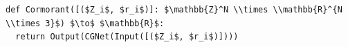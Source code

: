 \documentclass[border=10pt]{standalone}
\begin{document}
\begin{lstlisting}
def Cormorant([($Z_i$, $r_i$)]: $\mathbb{Z}^N \\times \\mathbb{R}^{N \\times 3}$) $\to$ $\mathbb{R}$:
  return Output(CGNet(Input([($Z_i$, $r_i$)])))
\end{lstlisting}
\end{document}
